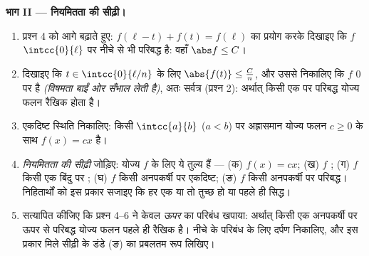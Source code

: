 \begin{problem}[{सप्ताहांत समस्या --- $f(x + y) = f(x) + f(y)$: नियमितता रैखिकता पर बाध्य कर देती है, और राक्षसों
का चित्र}]
\medskip \noindent\textbf{भाग II --- नियमितता की सीढ़ी।}
\begin{enumerate}[resume]
  \item प्रश्न 4 को आगे बढ़ाते हुए: $f(\ell - t) + f(t) = f(\ell)$ का प्रयोग
  करके दिखाइए कि $f$ $\intcc{0}{\ell}$ पर नीचे से भी परिबद्ध है: वहाँ $\abs
  f \leq C$।
  \item दिखाइए कि $t \in \intcc{0}{\ell/n}$ के लिए $\abs{f(t)} \leq
  \frac{C}{n}$, और उससे निकालिए कि $f$ $0$ पर  है \emph{(विषमता बाईं ओर
  सँभाल लेती है)}, अतः सर्वत्र (प्रश्न 2): अर्थात् किसी एक  पर परिबद्ध
  योज्य फलन रैखिक होता है।
  \item एकदिष्ट स्थिति निकालिए: किसी $\intcc{a}{b}$ ($a < b$) पर अह्रासमान
  योज्य फलन $c \geq 0$ के साथ $f(x) = cx$ है।
  \item \emph{नियमितता की सीढ़ी} जोड़िए: योज्य $f$ के लिए ये तुल्य हैं ---
  (क) $f(x) = cx$; (ख) $f$ ; (ग) $f$ किसी एक बिंदु पर ; (घ) $f$ किसी
  अनपकर्षी  पर एकदिष्ट; (ङ) $f$ किसी अनपकर्षी  पर परिबद्ध।
  निहितार्थों को इस प्रकार सजाइए कि हर एक या तो तुच्छ हो या पहले ही सिद्ध।
  \item सत्यापित कीजिए कि प्रश्न 4--6 ने केवल \emph{ऊपर} का परिबंध खपाया:
  अर्थात् किसी एक अनपकर्षी  पर ऊपर से परिबद्ध योज्य फलन पहले ही रैखिक
  है। नीचे के परिबंध के लिए दर्पण  निकालिए, और इस प्रकार मिले सीढ़ी के
  डंडे (ङ) का प्रबलतम रूप लिखिए।
\end{enumerate}


\end{problem}

